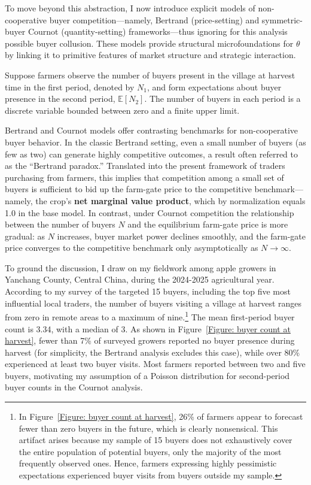 To move beyond this abstraction, I now introduce explicit models of non-cooperative buyer competition---namely, Bertrand (price-setting) and symmetric-buyer Cournot (quantity-setting) frameworks---thus ignoring for this analysis possible buyer collusion. These models provide structural microfoundations for $\theta$ by linking it to primitive features of market structure and strategic interaction.


Suppose farmers observe the number of buyers present in the village at harvest time in the first period, denoted by $N_1$, and form expectations about buyer presence in the second period, $\mathbb{E}[N_2]$. The number of buyers in each period is a discrete variable bounded between zero and a finite upper limit.

Bertrand and Cournot models offer contrasting benchmarks for non-cooperative buyer behavior. In the classic Bertrand setting, even a small number of buyers (as few as two) can generate highly competitive outcomes, a result often referred to as the ``Bertrand paradox.'' Translated into the present framework of traders purchasing from farmers, this implies that competition among a small set of buyers is sufficient to bid up the farm-gate price to the competitive benchmark---namely, the crop's \textbf{net marginal value product}, which by normalization equals 1.0 in the base model. In contrast, under Cournot competition the relationship between the number of buyers $N$ and the equilibrium farm-gate price is more gradual: as $N$ increases, buyer market power declines smoothly, and the farm-gate price converges to the competitive benchmark only asymptotically as $N \to \infty$.


To ground the discussion, I draw on my fieldwork among apple growers in Yanchang County, Central China, during the 2024-2025 agricultural year. According to my survey of the targeted 15 buyers, including the top five most influential local traders, the number of buyers visiting a village at harvest ranges from zero in remote areas to a maximum of nine.\footnote{In Figure~\ref{Figure: buyer count at harvest}, 26\% of farmers appear to forecast fewer than zero buyers in the future, which is clearly nonsensical. This artifact arises because my sample of 15 buyers does not exhaustively cover the entire population of potential buyers, only the majority of the most frequently observed ones. Hence, farmers expressing highly pessimistic expectations experienced buyer visits from buyers outside my sample.} The mean first-period buyer count is 3.34, with a median of 3. As shown in Figure~\ref{Figure: buyer count at harvest}, fewer than 7\% of surveyed growers reported no buyer presence during harvest (for simplicity, the Bertrand analysis excludes this case), while over 80\% experienced at least two buyer visits. Most farmers reported between two and five buyers, motivating my assumption of a Poisson distribution for second-period buyer counts in the Cournot analysis.

